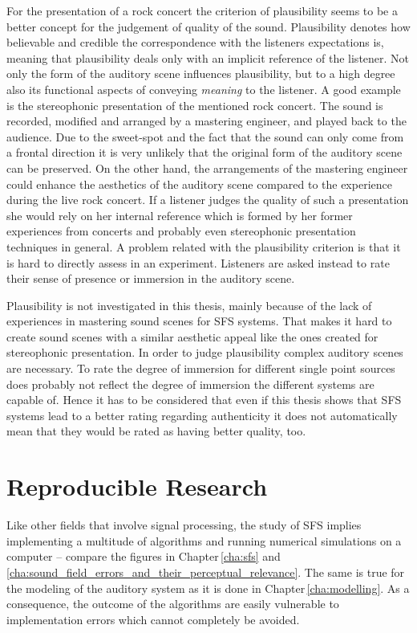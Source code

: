 For the presentation of a rock concert the criterion of plausibility seems to
be a better concept for the judgement of quality of the sound.
Plausibility denotes how believable and credible the correspondence with the
listeners expectations is,
meaning that plausibility deals only with an implicit reference of the
listener.\autocite{Raake2013}
Not only the form of the auditory scene influences plausibility, but
to a high degree also its functional aspects of conveying \emph{meaning} to the
listener.
A good example is the stereophonic presentation of the mentioned rock concert. The
sound is recorded, modified and arranged by a mastering engineer, and played
back to the audience. Due to the sweet-spot and the fact that the sound
can only come from a frontal direction it is very unlikely that the original
form of the auditory scene can be preserved. On the
other hand, the arrangements of the mastering engineer could enhance the
aesthetics of the auditory scene compared to the experience during the live
rock concert. If a listener judges the quality of such a presentation she
would rely on her internal reference which is formed by her former experiences
from concerts and probably even stereophonic presentation techniques in general.
%
A problem related with the plausibility criterion is that it is hard to directly
assess in an experiment. Listeners are asked instead to rate their sense
of presence or immersion in the auditory scene.

Plausibility is not investigated in this thesis, mainly because of the lack
of experiences in mastering sound scenes for \ac{SFS} systems. That makes
it hard to create sound scenes with a similar aesthetic appeal like the ones
created for stereophonic presentation. In order to judge plausibility complex
auditory scenes are necessary. To rate the degree of immersion for different
single point sources does probably not reflect the degree of immersion the
different systems are capable of.
Hence it has to be considered that even if this thesis shows that
\ac{SFS} systems lead to a better rating regarding authenticity it does not
automatically mean that they would be rated as having better quality, too.


\section{Reproducible Research}
\label{sec:reproducible_research}
%
Like other fields that involve signal processing, the study of \ac{SFS}
implies implementing a multitude of algorithms and running numerical simulations
on a computer -- compare the figures in
Chapter\,\ref{cha:sfs} and
\ref{cha:sound_field_errors_and_their_perceptual_relevance}. The same is true for
the modeling of the auditory system as it is done in
Chapter\,\ref{cha:modelling}.
As a consequence, the outcome of the algorithms are easily vulnerable to
implementation errors which cannot completely be
avoided.

